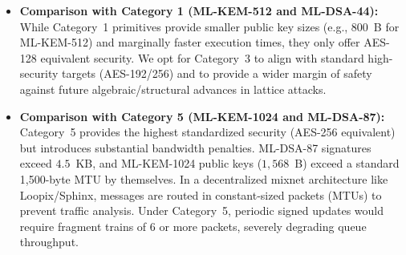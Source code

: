 \documentclass[11pt,a4paper]{article}
\theoremstyle{remark}
\theoremstyle{plain}
\begin{document}
\begin{itemize}
  \item \textbf{Comparison with Category 1 (ML-KEM-512 and ML-DSA-44):} While Category~1 primitives provide smaller public key sizes (e.g., 800~B for ML-KEM-512) and marginally faster execution times, they only offer AES-128 equivalent security. We opt for Category~3 to align with standard high-security targets (AES-192/256) and to provide a wider margin of safety against future algebraic/structural advances in lattice attacks.
  \item \textbf{Comparison with Category 5 (ML-KEM-1024 and ML-DSA-87):} Category~5 provides the highest standardized security (AES-256 equivalent) but introduces substantial bandwidth penalties. ML-DSA-87 signatures exceed $4.5$~KB, and ML-KEM-1024 public keys ($1{,}568$~B) exceed a standard 1{,}500-byte MTU by themselves. In a decentralized mixnet architecture like Loopix/Sphinx, messages are routed in constant-sized packets (MTUs) to prevent traffic analysis. Under Category~5, periodic signed updates would require fragment trains of 6 or more packets, severely degrading queue throughput.
\end{itemize}
\end{document}
